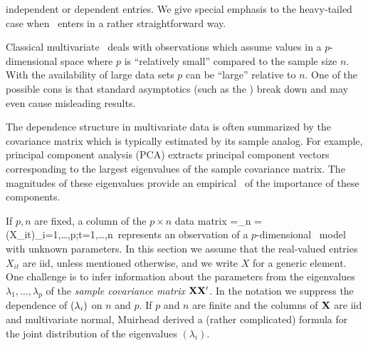 independent or dependent entries. We give special emphasis to the heavy-tailed case when \evt\ enters in a rather
straightforward way.
\par
Classical multivariate \tsa\ deals with
observations which assume values in a $p$-dimensional space
where $p$ is ``relatively small'' compared to the sample size $n$.  With
the availability of large data sets $p$ can be ``large''
relative to $n$. One of the possible con\seq s is that standard asymptotics (such as the \clt )
break down and may even cause misleading results.
\par
The dependence
structure in multivariate data is often summarized by the covariance matrix which is typically
estimated by its sample analog.  For example, principal component analysis (PCA)
extracts principal component vectors corresponding to the largest
eigenvalues of the sample covariance matrix. The magnitudes of these eigenvalues provide an empirical \ms\ of the importance
of these components.
\par
If $p,n$ are fixed, a column of the $p\times n$ data matrix
\beao
\X =\X_n = \big(X_{it}\big)_{i=1,\ldots,p;t=1,\ldots,n}\,
\eeao
represents an observation of a $p$-dimensional \ts\ model with unknown parameters.
In this section we assume that the real-valued entries $X_{it}$ are iid, unless mentioned otherwise, and we write $X$ for a generic element.
One challenge is to infer information about the parameters
from the eigenvalues $\lambda_1,\ldots,\lambda_p$
of the {\em sample covariance matrix} ${\mathbf X}{\mathbf X}'$. In the notation we suppress the dependence of $(\lambda_i)$ on $n$ and $p$.
If $p$ and $n$ are finite and the columns of ${\mathbf X}$ are iid and multivariate normal,
Muirhead \cite{muirhead} derived a (rather complicated) formula for the joint distribution of the eigenvalues $(\lambda_i)$.


